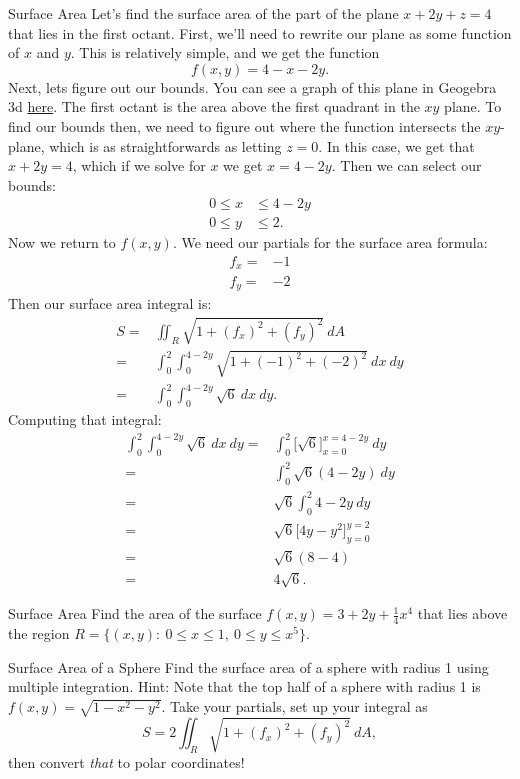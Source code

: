 \begin{example}{Surface Area}
Let's find the surface area of the part of the plane $x+2y+z=4$ that lies in the first octant. First, we'll need to rewrite our plane as some function of $x$ and $y$. This is relatively simple, and we get the function $$f(x,y)=4-x-2y. $$
Next, lets figure out our bounds. You can see a graph of this plane in Geogebra 3d \href{https://www.geogebra.org/3d/qevz8eev}{here}. The first octant is the area above the first quadrant in the $xy$ plane. To find our bounds then, we need to figure out where the function intersects the $xy$-plane, which is as straightforwards as letting $z=0$. In this case, we get that $x+2y=4$, which if we solve for $x$ we get $x=4-2y$. Then we can select our bounds:
\begin{align*}
0\leq x&\leq 4-2y \\
0\leq y&\leq 2.
\end{align*}
Now we return to $f(x,y)$. We need our partials for the surface area formula:
\begin{align*}
f_x=&-1\\
f_y=&-2
\end{align*}
Then our surface area integral is:
\begin{align*}
S=&\iint_R \sqrt{1+(f_x)^2+(f_y)^2}\ dA\\
=&\int_{0}^2 \int_{0}^{4-2y}\sqrt{1+(-1)^2+(-2)^2}\ dx \ dy \\
=&\int_{0}^2 \int_{0}^{4-2y}\sqrt{6}\ dx \ dy.
\end{align*}
Computing that integral:
\begin{align*}
\int_{0}^2 \int_{0}^{4-2y}\sqrt{6}\ dx \ dy =& \int_{0}^2\Bigg[\sqrt{6}\Bigg]_{x=0}^{x=4-2y}\ dy\\
=&\int_0^2 \sqrt{6}(4-2y) \ dy\\
=&\sqrt{6}\int_0^2 4-2y\ dy\\
=&\sqrt{6}\Bigg[4y-y^2 \Bigg]_{y=0}^{y=2}\\
=&\sqrt{6}(8-4)\\
=&4\sqrt{6}.
\end{align*}
\end{example}

\begin{pexercise}{Surface Area}
Find the area of the surface $f(x,y)=3+2y+\frac{1}{4}x^4$ that lies above the region $R=\{(x,y):\ 0\leq x\leq 1,\ 0\leq y\leq x^5 \}$.
\end{pexercise}

\begin{exercise}{Surface Area of a Sphere}
Find the surface area of a sphere with radius 1 using multiple integration. Hint: Note that the top half of a sphere with radius 1 is $f(x,y)=\sqrt{1-x^2-y^2}$. Take your partials, set up your integral as $$ S=2\iint_R \sqrt{1+(f_x)^2+(f_y)^2} \ dA,$$ then convert \textit{that} to polar coordinates!
\end{exercise}
